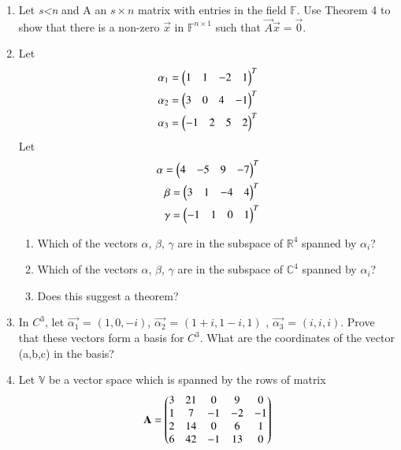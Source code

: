 \renewcommand{\theequation}{\theenumi}
\renewcommand{\thefigure}{\theenumi}
\begin{enumerate}[label=\thesubsection.\arabic*.,ref=\thesubsection.\theenumi]
%
\item Let \textit{s\textless n} and A an $s\times n$ matrix with entries in the field $\mathbb{F}$. Use Theorem 4 to show that there is a non-zero $\vec{x}$ in $\mathbb{F}^{n\times 1}$ such that $\vec{A}\vec{x}=\vec{0}$. 
%
\\
\solution

%
\item Let
\begin{align} 
\alpha_1=\begin{pmatrix}1&1&-2&1\end{pmatrix}^T \\
\alpha_2=\begin{pmatrix}3&0&4&-1\end{pmatrix}^T \\
\alpha_3=\begin{pmatrix}-1&2&5&2\end{pmatrix}^T
\end{align}
Let
\begin{align}
\alpha=\begin{pmatrix}4&-5&9&-7\end{pmatrix}^T \\
\beta=\begin{pmatrix}3&1&-4&4\end{pmatrix}^T \\
\gamma=\begin{pmatrix}-1&1&0&1\end{pmatrix}^T
\end{align}
\begin{enumerate}
\item Which of the vectors $\alpha$, $\beta$, $\gamma$ are in the subspace of $\mathbb{R}^4$ spanned by $\alpha_i$?
\item Which of the vectors $\alpha$, $\beta$, $\gamma$ are in the subspace of $\mathbb{C}^4$ spanned by $\alpha_i$?
\item Does this suggest a theorem?
\end{enumerate}
%
%
\solution

%
\item In $C^3$, let $\vec{\alpha_1}$ = $(1,0,-i)$, $\vec{\alpha_2}$ = $(1+i,1-i,1)$ , $\vec{\alpha_3}$ = $(i,i,i)$. Prove that these vectors form a basis for $C^3$. What are the coordinates of the vector (a,b,c) in the basis?
%
\\
\solution

%
\item Let $\mathbb{V}$ be a vector space which is spanned by the rows of matrix
\begin{align}
    \mathbf{A} = \begin{pmatrix}3&21&0&9&0\\1&7&-1&-2&-1\\2&14&0&6&1\\6&42&-1&13&0\end{pmatrix}\label{eq:solutions/2/5/6/eq:mat}
\end{align}
\begin{enumerate}[label=\alph*.]

\end{enumerate}
\end{enumerate}
